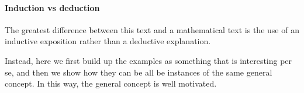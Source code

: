 \paragraph{Induction vs deduction}

The greatest difference between this text and a mathematical text is the use of an inductive exposition rather than a deductive explanation.

Instead, here we first build up the examples as something that is interesting per se, and then we show how they can be all be instances of the same general concept.
In this way, the general concept is well motivated.

